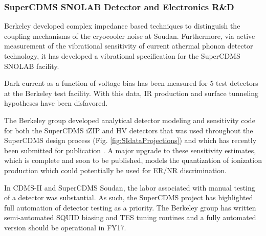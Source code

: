 \subsubsection{SuperCDMS SNOLAB Detector and Electronics R\&D}
\label{subsec:DetElRnD}
\begin{compactitem}
	\item Berkeley developed  complex impedance based techniques to distinguish the coupling mechanisms of the cryocooler noise at Soudan. Furthermore, via active measurement of the vibrational sensitivity of current athermal phonon detector technology, it has developed a vibrational specification for the SuperCDMS SNOLAB facility.

		
	\item %
	Dark current as a function of voltage bias has been measured for 5 test detectors at the Berkeley test facility. With this data, IR production and surface tunneling hypotheses have been disfavored.
	
	\item %
	The Berkeley group developed analytical detector modeling and sensitivity code for both the SuperCDMS iZIP and HV detectors that was used throughout the SuperCDMS design process (Fig. \ref{fig:SIdataProjections}) and which has recently been submitted for publication \cite{Agnese:2016cpb}.  A major upgrade to these sensitivity estimates, which is complete and soon to be published, models the quantization of ionization production which could potentially be used for ER/NR discrimination.
\item %
	In CDMS-II and SuperCDMS Soudan, the labor associated with manual  testing of a detector was substantial. %
	As such, the SuperCDMS project has highlighted full automation of detector testing as a priority.  The Berkeley group has written semi-automated SQUID biasing and TES tuning routines %
	and a fully automated version should be operational in FY17. 
	

\end{compactitem}
